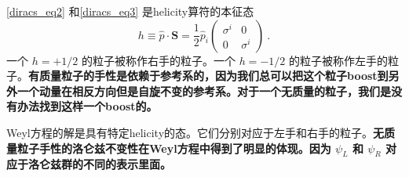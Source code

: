 \autoref{diracs_eq2} 和\autoref{diracs_eq3} 是helicity算符的本征态
\begin{equation}
h\equiv\hat p \cdot \mathbf S = \frac{1}{2} \hat p_i \begin{pmatrix}
\sigma^i & 0 \\
 0 & \sigma^i
\end{pmatrix}~.
\end{equation}
一个 $h=+1/2$ 的粒子被称作右手的粒子。一个 $h=-1/2$ 的粒子被称作左手的粒子。\textbf{有质量粒子的手性是依赖于参考系的，因为我们总可以把这个粒子boost到另外一个动量在相反方向但是自旋不变的参考系。对于一个无质量的粒子，我们是没有办法找到这样一个boost的。}

Weyl方程的解是具有特定helicity的态。它们分别对应于左手和右手的粒子。\textbf{无质量粒子手性的洛仑兹不变性在Weyl方程中得到了明显的体现。因为 $\psi_L$ 和 $\psi_R$ 对应于洛仑兹群的不同的表示里面。}

